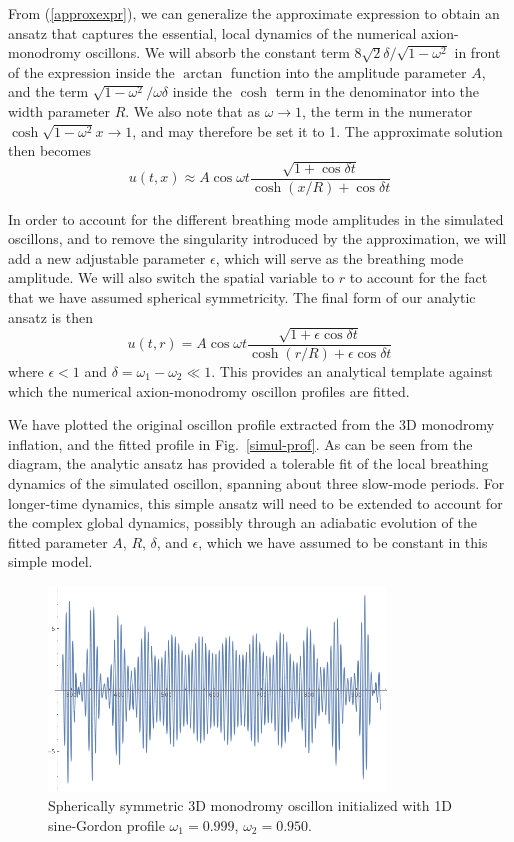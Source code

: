 \documentclass{report}
\begin{document}
From (\ref{approxexpr}), we can generalize the approximate expression to obtain an ansatz that captures the essential, local dynamics of the numerical axion-monodromy oscillons. We will absorb the constant term $8\sqrt{2}  \delta/\sqrt{1-\omega^2}$ in front of the expression inside the $\arctan$ function into the amplitude parameter $A$, and the term $\sqrt{1-\omega^2}/\omega\delta$ inside the $\cosh$ term in the denominator into the width parameter $R$. We also note that as $\omega\to1$, the term in the numerator $\cosh\sqrt{1-\omega^2} x\to1$, and may therefore be set it to 1. The approximate solution then becomes
\begin{equation}
  u(t,x) \approx A \cos\omega t \frac{\sqrt{1+\cos\delta t} }{\cosh(x/R) + \cos \delta t}  
\end{equation}

In order to account for the different breathing mode amplitudes in the simulated oscillons, and to remove the singularity introduced by the approximation, we will add a new adjustable parameter $\epsilon$, which will serve as the breathing mode amplitude. We will also switch the spatial variable to $r$ to account for the fact that we have assumed spherical symmetricity. The final form of our analytic ansatz is then
\begin{equation} \label{fitprof}
  u(t,r) = A\cos\omega t \frac{\sqrt{1+\epsilon \cos \delta t}}{\cosh(r/R) + \epsilon \cos \delta t}
\end{equation}
where $\epsilon<1$ and $\delta = \omega_1-\omega_2 \ll 1$. This provides an analytical template against which the numerical axion-monodromy oscillon profiles are fitted.

We have plotted the original oscillon profile extracted from the 3D monodromy inflation, and the fitted profile in Fig.~\ref{simul-prof}. As can be seen from the diagram, the analytic ansatz has provided a tolerable fit of the local breathing dynamics of the simulated oscillon, spanning about three slow-mode periods. For longer-time dynamics, this simple ansatz will need to be extended to account for the complex global dynamics, possibly through an adiabatic evolution of the fitted parameter $A$, $R$, $\delta$, and $\epsilon$, which we have assumed to be constant in this simple model.

\begin{figure}
  \centering
  \includegraphics[width=0.8\textwidth]{plot/profile-3scale.png}
  \caption{Spherically symmetric 3D monodromy oscillon initialized with 1D
    sine-Gordon profile $\omega_1=0.999$, $\omega_2=0.950$.}\label{threescales}
\end{figure}
\end{document}
